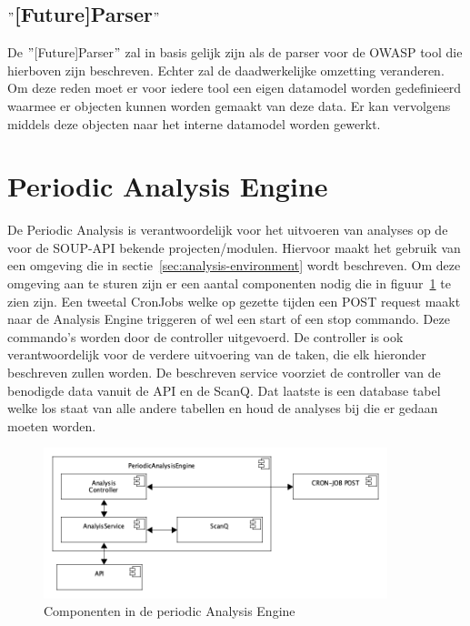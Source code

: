 \subsection{$"$[Future]Parser$"$}\label{subsec:$"$[future]parser$"$}
De $"$[Future]Parser$"$ zal in basis gelijk zijn als de parser voor de OWASP tool die hierboven zijn beschreven. Echter zal de daadwerkelijke omzetting veranderen. Om deze reden moet er voor iedere tool een eigen datamodel worden gedefinieerd waarmee er objecten kunnen worden gemaakt van deze data. Er kan vervolgens middels deze objecten naar het interne datamodel worden gewerkt.
\clearpage


\section{Periodic Analysis Engine}\label{sec:periodiek-analysis-engine}
De Periodic Analysis is verantwoordelijk voor het uitvoeren van analyses op de voor de SOUP-API bekende projecten/modulen. Hiervoor maakt het gebruik van een omgeving die in sectie~\ref{sec:analysis-environment} wordt beschreven. Om deze omgeving aan te sturen zijn er een aantal componenten nodig die in figuur~\ref{fig:paeComps} te zien zijn. Een tweetal CronJobs welke op gezette tijden een POST request maakt naar de Analysis Engine triggeren of wel een start of een stop commando. Deze commando's worden door de controller uitgevoerd. De controller is ook verantwoordelijk voor de verdere uitvoering van de taken, die elk hieronder beschreven zullen worden. De beschreven service voorziet de controller van de benodigde data vanuit de API en de ScanQ. Dat laatste is een database tabel welke los staat van alle andere tabellen en houd de analyses bij die er gedaan moeten worden.
\begin{figure}[bth]
    \myfloatalign
    \includegraphics[width=10cm]{gfx/umlet/exports/PeriodicAnalyisEngineComponents}
    \caption{Componenten in de periodic Analysis Engine}
    \label{fig:paeComps}
\end{figure}
